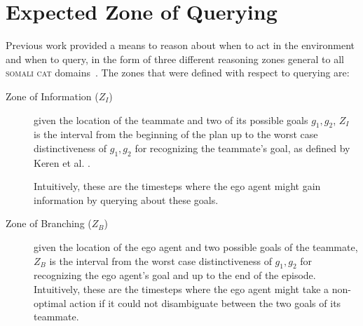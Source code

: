 \documentclass[letterpaper]{article}
\begin{document}
\section{Expected Zone of Querying}
Previous work provided a means to reason about when to act in the environment and when to query, in the form of three different reasoning zones general to all \textsc{somali cat} domains~\cite{mirskypenny}. The zones that were defined with respect to querying are: %
\begin{description} 
\item [Zone of Information ($Z_I$)] given the location of the teammate and two of its possible goals $g_1,g_2$, $Z_I$ is the interval from the beginning of the plan up to the worst case distinctiveness of $g_1,g_2$ for recognizing the teammate's goal, as defined by Keren et al. .



Intuitively, these are the timesteps where the ego agent might gain information by querying about these goals.

\item [Zone of Branching ($Z_B$)] given the location of the ego agent and two possible goals of the teammate, $Z_B$ is the interval from the worst case distinctiveness of $g_1,g_2$ for recognizing the ego agent's goal and up to the end of the episode.
Intuitively, these are the timesteps where the ego agent might take a non-optimal action if it could not disambiguate between the two goals of its teammate.



\end{description}
\end{document}
